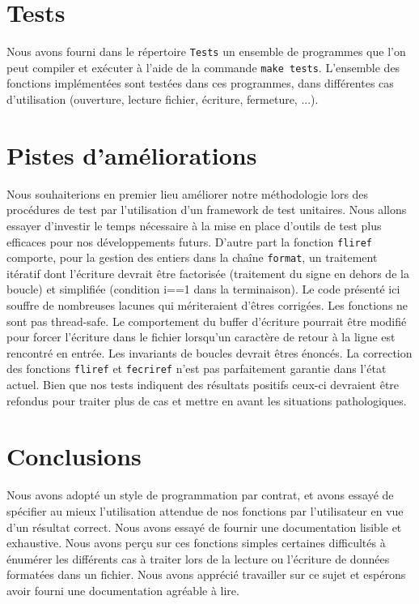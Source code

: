 \documentclass[11pt]{article}
\theoremstyle{definition}
\theoremstyle{definition}
\begin{document}
\section{Tests}
Nous avons fourni dans le répertoire \texttt{Tests} un ensemble de programmes que l'on peut compiler et exécuter à l'aide de la commande
\texttt{make tests}. L'ensemble des fonctions implémentées sont testées dans ces programmes, dans différentes cas d'utilisation
(ouverture, lecture fichier, écriture, fermeture, ...).

\section{Pistes d'améliorations}
Nous souhaiterions en premier lieu améliorer notre méthodologie lors des procédures de test par l'utilisation d'un framework de test unitaires.
Nous allons essayer d'investir le temps nécessaire à la mise en place d'outils de test plus efficaces pour nos développements futurs.
D'autre part la fonction \texttt{fliref} comporte, pour la gestion des entiers dans la chaîne \texttt{format}, un traitement itératif
dont l'écriture devrait être factorisée (traitement du signe en dehors de la boucle) et simplifiée
(condition i==1 dans la terminaison). Le code présenté ici souffre de nombreuses lacunes qui mériteraient d'êtres corrigées.
Les fonctions ne sont pas thread-safe. Le comportement du buffer d'écriture pourrait être modifié pour forcer l'écriture dans
le fichier lorsqu'un caractère de retour à la ligne est rencontré en entrée. Les invariants de boucles devrait êtres énoncés.
La correction des fonctions \texttt{fliref} et \texttt{fecriref} n'est pas parfaitement garantie dans l'état actuel.
Bien que nos tests indiquent des résultats positifs ceux-ci devraient être refondus pour traiter plus de cas et mettre en avant
les situations pathologiques.

\section{Conclusions}
Nous avons adopté un style de programmation par contrat, et avons essayé de
spécifier au mieux l'utilisation attendue de nos fonctions par l'utilisateur en vue d'un résultat correct.
Nous avons essayé de fournir une documentation lisible et exhaustive. Nous avons perçu sur ces fonctions
simples certaines difficultés à énumérer les différents cas à traiter lors de la lecture ou l'écriture
de données formatées dans un fichier. Nous avons apprécié travailler sur ce sujet et espérons avoir fourni une
documentation agréable à lire.
\end{document}
